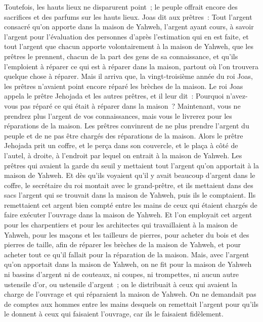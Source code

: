 \begin{multicols}{2}
Toutefois, les hauts lieux ne disparurent point~; le peuple offrait encore des sacrifices et des parfums sur les hauts lieux.
Joas dit aux prêtres~: Tout l'argent consacré qu'on apporte dans la maison de Yahweh, l'argent ayant cours, à savoir l'argent pour l'évaluation des personnes d'après l'estimation qui en est faite, et tout l'argent que chacun apporte volontairement à la maison de Yahweh,
que les prêtres le prennent, chacun de la part des gens de sa connaissance, et qu'ils l'emploient à réparer ce qui est à réparer dans la maison, partout où l'on trouvera quelque chose à réparer.
Mais il arriva que, la vingt-troisième année du roi Joas, les prêtres n'avaient point encore réparé les brèches de la maison.
Le roi Joas appela le prêtre Jehojada et les autres prêtres, et il leur dit~: Pourquoi n'avez-vous pas réparé ce qui était à réparer dans la maison~? Maintenant, vous ne prendrez plus l'argent de vos connaissances, mais vous le livrerez pour les réparations de la maison.
Les prêtres convinrent de ne plus prendre l'argent du peuple et de ne pas être chargés des réparations de la maison.
Alors le prêtre Jehojada prit un coffre, et le perça dans son couvercle, et le plaça à côté de l'autel, à droite, à l'endroit par lequel on entrait à la maison de Yahweh. Les prêtres qui avaient la garde du seuil y mettaient tout l'argent qu'on apportait à la maison de Yahweh.
Et dès qu'ils voyaient qu'il y avait beaucoup d'argent dans le coffre, le secrétaire du roi montait avec le grand-prêtre, et ils mettaient dans des sacs l'argent qui se trouvait dans la maison de Yahweh, puis ils le comptaient.
Ils remettaient cet argent bien compté entre les mains de ceux qui étaient chargés de faire exécuter l'ouvrage dans la maison de Yahweh. Et l'on employait cet argent pour les charpentiers et pour les architectes qui travaillaient à la maison de Yahweh,
pour les maçons et les tailleurs de pierres, pour acheter du bois et des pierres de taille, afin de réparer les brèches de la maison de Yahweh, et pour acheter tout ce qu'il fallait pour la réparation de la maison.
Mais, avec l'argent qu'on apportait dans la maison de Yahweh, on ne fit pour la maison de Yahweh ni bassins d'argent ni de couteaux, ni coupes, ni trompettes, ni aucun autre ustensile d'or, ou ustensile d'argent~;
on le distribuait à ceux qui avaient la charge de l'ouvrage et qui réparaient la maison de Yahweh.
On ne demandait pas de comptes aux hommes entre les mains desquels on remettait l'argent pour qu'ils le donnent à ceux qui faisaient l'ouvrage, car ils le faisaient fidèlement.

\end{multicols}
